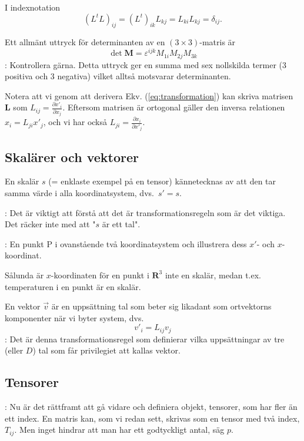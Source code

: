 \documentclass[%
oneside,                 %
final,                   %
10pt]{article}
\newcommand{\shortinlinecomment}[3]{{\color{red}{\bf #1}: #2}}
\newcommand{\longinlinecomment}[3]{{\color{red}{\bf #1}: #2}}
\begin{document}
I indexnotation
\begin{equation}
\left( L^t L \right)_{ij} = \left( L^t \right)_{ik} L_{kj} 
= L_{ki}L_{kj}=\delta_{ij}.
\end{equation}

Ett allmänt uttryck för determinanten av en $(3\times3)$-matris är 
\begin{equation}
\det\mathbf{M}=\varepsilon^{ijk}M_{1i}M_{2j}M_{3k}
\end{equation}
\longinlinecomment{Comment 3}{ Kontrollera gärna. Detta uttryck ger en summa med sex nollskilda termer (3 positiva och 3 negativa) vilket alltså motsvarar determinanten. }{ Kontrollera gärna. Detta uttryck }

Notera att vi genom att derivera Ekv. (\ref{eq:transformation}) kan skriva matrisen $\mathbf{L}$ som $L_{ij}=\frac{\partial x'_i}{\partial x_j}$. Eftersom matrisen är ortogonal gäller den inversa relationen $x_i=L_{ji}x'_j$, och vi har också $L_{ji}=\frac{\partial x_i}{\partial x'_j}$.

\subsection{Skalärer och vektorer}
En skalär $s$ (= enklaste exempel på en tensor) kännetecknas av att den tar samma värde i alla koordinatsystem, dvs.~$s'=s$. 

\longinlinecomment{Comment 4}{ Det är viktigt att förstå att det är transformationsregeln som är det viktiga. Det räcker inte med att "$s$ är ett tal". }{ Det är viktigt att } 

\shortinlinecomment{Rita 5}{ En punkt P i ovanstående två koordinatsystem och illustrera dess $x'$- och $x$-koordinat. }{ En punkt P i }

Sålunda är $x$-koordinaten för en punkt i $\mathbf{R}^3$ inte en skalär, medan t.ex. temperaturen i en punkt är en skalär. 

En vektor $\vec v$ är en uppsättning tal som beter sig likadant som ortvektorns komponenter när vi byter system, dvs.
\begin{equation}
v'_i=L_{ij}v_j
\end{equation}
\longinlinecomment{Comment 6}{ Det är denna transformationsregel som definierar vilka uppsättningar av tre (eller $D$) tal som får privilegiet att kallas vektor. }{ Det är denna transformationsregel }

\subsection{Tensorer}
\longinlinecomment{Comment 7}{ Nu är det rättframt att gå vidare och definiera objekt,  tensorer, som har fler än ett index. En matris kan, som vi redan sett, skrivas som en tensor med två index, $T_{ij}$. Men inget hindrar att man har ett godtyckligt antal, säg $p$. }{ Nu är det rättframt }
\end{document}
